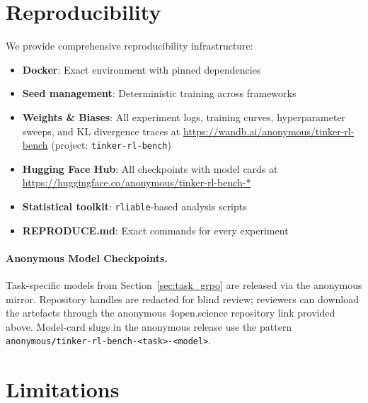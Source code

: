 \documentclass{article}
\begin{document}
\section{Reproducibility}
\label{sec:reproducibility}

We provide comprehensive reproducibility infrastructure:
\begin{itemize}
    \item \textbf{Docker}: Exact environment with pinned dependencies
    \item \textbf{Seed management}: Deterministic training across frameworks
    \item \textbf{Weights \& Biases}: All experiment logs, training curves,
    hyperparameter sweeps, and KL divergence traces at
    \url{https://wandb.ai/anonymous/tinker-rl-bench}
    (project: \texttt{tinker-rl-bench})
    \item \textbf{Hugging Face Hub}: All checkpoints with model cards at
    \url{https://huggingface.co/anonymous/tinker-rl-bench-*}
    \item \textbf{Statistical toolkit}: \texttt{rliable}-based analysis scripts
    \item \textbf{REPRODUCE.md}: Exact commands for every experiment
\end{itemize}

\paragraph{Anonymous Model Checkpoints.}
Task-specific models from Section~\ref{sec:task_grpo} are released via the
anonymous mirror. Repository handles are redacted for blind review; reviewers
can download the artefacts through the anonymous 4open.science repository
link provided above. Model-card slugs in the anonymous release use the
pattern \texttt{anonymous/tinker-rl-bench-<task>-<model>}.

\section{Limitations}
\label{sec:limitations}
\end{document}
